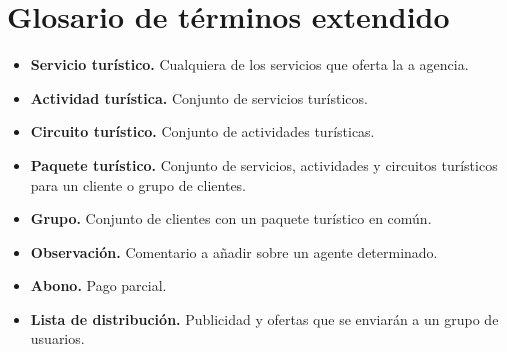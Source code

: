 \documentclass{article}
\begin{document}
	\section{Glosario de términos extendido}
	\begin{itemize}
		\item \textbf{Servicio turístico.} Cualquiera de los servicios que oferta la a agencia.
		\item \textbf{Actividad turística.} Conjunto de servicios turísticos.
		\item \textbf{Circuito turístico.} Conjunto de actividades turísticas.
		\item \textbf{Paquete turístico.} Conjunto de servicios, actividades y circuitos turísticos para un cliente o grupo de clientes.
		\item \textbf{Grupo.} Conjunto de clientes con un paquete turístico en común.
		\item \textbf{Observación.} Comentario a añadir sobre un agente determinado.
		\item \textbf{Abono.} Pago parcial.
		\item \textbf{Lista de distribución.} Publicidad y ofertas que se enviarán a un grupo de usuarios.
	\end{itemize}
\end{document}
